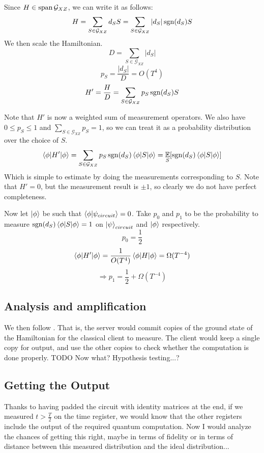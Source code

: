 Since $H\in\operatorname*{\operatorname{span}}\mathcal{G}_{XZ}$, we can write it as follows:
$$H=\sum_{S\in\mathcal{G}_{XZ}} d_S S= \sum_{S\in\mathcal{G}_{XZ}} |d_S|\operatorname{sgn}(d_S)S$$
We then scale the Hamiltonian.
$$D=\sum_{S\in\mathcal{G}_{XZ}}|d_S|$$
$$p_S=\frac{|d_S|}{D}=O(T^4)$$
$$H'=\frac{H}{D}=\sum_{S\in\mathcal{G}_{XZ}} p_S\operatorname{sgn}(d_S)S$$

Note that $H'$ is now a weighted sum of measurement operators. We also have $0\leq p_S\leq1$ and $\sum_{S\in\mathcal{G}_{XZ}} p_S=1$, so we can treat it as a probability distribution over the choice of $S$.
$$\braket{\phi|H'|\phi}=\sum_{S\in\mathcal{G}_{XZ}} p_S\operatorname{sgn}(d_S)\braket{\phi|S|\phi}=\operatorname*{\mathbb{E}}_S[\operatorname{sgn}(d_S)\braket{\phi|S|\phi}]$$
Which is simple to estimate by doing the measurements corresponding to $S$.
Note that $H'=0$, but the measurement result is $\pm1$, so clearly we do not have perfect completeness.

Now let $\ket\phi$ be such that $\braket{\phi|\psi_{circuit}}=0$.
Take $p_0$ and $p_1$ to be the probability to measure $\operatorname{sgn}(d_S)\braket{\phi|S|\phi}=1$ on $\ket\psi_{circuit}$ and $\ket\phi$ respectively.
$$p_0=\frac{1}{2}$$
$$\braket{\phi|H'|\phi}=\frac{1}{O(T^4)}\braket{\phi|H|\phi}=\Omega(T^{-4})$$
$$\Rightarrow p_1=\frac{1}{2}+\Omega(T^{-4})$$

\subsection{Analysis and amplification}

We then follow \cite{mahadev_delegation}. That is, the server would commit copies of the ground state of the Hamiltonian for the classical client to measure.
The client would keep a single copy for output, and use the other copies to check whether the computation is done properly.
TODO Now what? Hypothesis testing...?

\subsection{Getting the Output}

Thanks to having padded the circuit with identity matrices at the end, if we measured $t>\frac{T}{2}$ on the time register, we would know that the other registers include the output of the required quantum computation. Now I would analyze the chances of getting this right, maybe in terms of fidelity or in terms of distance between this measured distribution and the ideal distribution...
